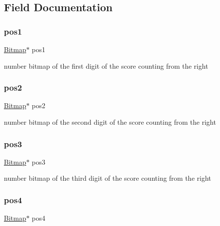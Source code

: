 \subsection{Field Documentation}
\mbox{\label{struct_score_a2a3a767ecef9123c1e42643582cab003}} 
\subsubsection{\texorpdfstring{pos1}{pos1}}
{\footnotesize\ttfamily \hyperlink{struct_bitmap}{Bitmap}$\ast$ pos1}



number bitmap of the first digit of the score counting from the right 

\mbox{\label{struct_score_a15053c692e0c6c1697973c862eec93ae}} 
\subsubsection{\texorpdfstring{pos2}{pos2}}
{\footnotesize\ttfamily \hyperlink{struct_bitmap}{Bitmap}$\ast$ pos2}



number bitmap of the second digit of the score counting from the right 

\mbox{\label{struct_score_ae6d712a88390d5bd95565149a4c4a68b}} 
\subsubsection{\texorpdfstring{pos3}{pos3}}
{\footnotesize\ttfamily \hyperlink{struct_bitmap}{Bitmap}$\ast$ pos3}



number bitmap of the third digit of the score counting from the right 

\mbox{\label{struct_score_a0fc4685b72d574cd90ba6bc7c7f5bae8}} 
\subsubsection{\texorpdfstring{pos4}{pos4}}
{\footnotesize\ttfamily \hyperlink{struct_bitmap}{Bitmap}$\ast$ pos4}



